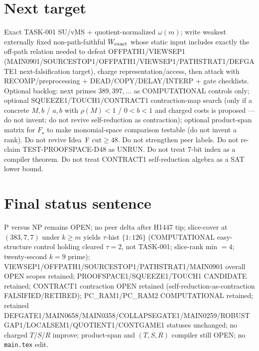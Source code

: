 \documentclass[11pt]{article}
\begin{document}
\section*{Next target}
Exact TASK-001 SU/vMS + quotient-normalized $\omega(m)$; write weakest externally fixed non-path-faithful
$W_{\rm exact}$ whose static input includes exactly the off-path relation needed to defeat OFFPATH1/VIEWSEP1
(MAIN0901/SOURCESTOP1/OFFPATH1/VIEWSEP1/PATHSTRAT1/DEFGATE1 next-falsification target), charge representation/access,
then attack with RECOMP/preprocessing + DEAD/COPY/DELAY/INTERP + gate checklists.
Optional backlog: next primes $389,397,\ldots$ as COMPUTATIONAL controls only;
optional SQUEEZE1/TOUCH1/CONTRACT1 contraction-map search (only if a concrete $M,b$ / $a,b$ with $\rho(M){<}1$ / $0{<}b{<}1$ and charged costs is proposed --- do not invent; do not revive self-reduction as contraction);
optional product-span matrix for $F_\star$ to make monomial-space comparison testable (do not invent a rank).
Do not revive Idea~F cut$\ge48$. Do not strengthen peer labels.
Do not re-claim TEST-PROOFSPACE-D48 as UNRUN.
Do not treat $7$-bit index as a compiler theorem.
Do not treat CONTRACT1 self-reduction algebra as a SAT lower bound.

\section*{Final status sentence}
P versus NP remains OPEN; no peer delta after H1447 tip; slice-cover at $(383,7,7)$ under $k{\ge}m$ yields $\tau$-hist $\{1{:}126\}$ (COMPUTATIONAL easy-structure control holding cleared $\tau{=}2$, not TASK-001; slice-rank min $=4$; twenty-second $k{=}9$ prime); VIEWSEP1/OFFPATH1/SOURCESTOP1/PATHSTRAT1/MAIN0901 overall OPEN scopes retained; PROOFSPACE1/SQUEEZE1/TOUCH1 CANDIDATE retained; CONTRACT1 contraction OPEN retained (self-reduction-as-contraction FALSIFIED/RETIRED); PC\_RAM1/PC\_RAM2 COMPUTATIONAL retained; retained DEFGATE1/MAIN0658/MAIN0358/COLLAPSEGATE1/MAIN0259/ROBUSTGAP1/LOCALSEM1/QUOTIENT1/CONTGAME1 statuses unchanged; no charged $T$/$S$/$R$ improve; product-span and $(T,S,R)$ compiler still OPEN; no \texttt{main.tex} edit.
\end{document}
